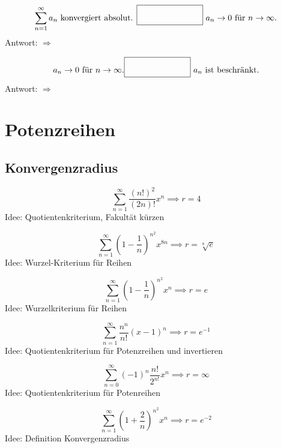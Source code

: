 \documentclass[parskip=full]{scrartcl}
\begin{document}
\begin{displaymath}
  \sum_{n = 1}^{\infty} a_n \text{ konvergiert absolut. } \fbox{\rule{1in}{0pt}\rule[-0.5ex]{0pt}{4ex}} \text{ } a_n \to 0 \text{ für } n \to \infty \text{.}
\end{displaymath}
Antwort: $\Rightarrow$

\begin{displaymath}
  a_n \to 0 \text{ für } n \to \infty \text{.} \fbox{\rule{1in}{0pt}\rule[-0.5ex]{0pt}{4ex}} \text{ } a_n \text{ ist beschränkt.}
\end{displaymath}
Antwort: $\Rightarrow$

\section{Potenzreihen}
\subsection{Konvergenzradius}
\begin{displaymath}
  \sum_{n = 1}^{\infty} \frac{(n!)^2}{(2n)!}x^n \implies r = 4
\end{displaymath}
Idee: Quotientenkriterium, Fakultät kürzen

\begin{displaymath}
  \sum_{n = 1}^{\infty} \left(1 - \frac{1}{n}\right)^{n^2} x^{8n} \implies r = \sqrt[8]{e}
\end{displaymath}
Idee: Wurzel-Kriterium für Reihen

\begin{displaymath}
  \sum_{n = 1}^{\infty} \left(1 - \frac{1}{n}\right)^{n^2}x^n \implies r = e
\end{displaymath}
Idee: Wurzelkriterium für Reihen

\begin{displaymath}
  \sum_{n = 1}^{\infty} \frac{n^n}{n!} (x-1)^n \implies r = e^{-1}
\end{displaymath}
Idee: Quotientenkriterium für Potenzreihen und invertieren

\begin{displaymath}
  \sum_{n = 0}^{\infty} (-1)^n \frac{n!}{2^{n!}} x^n \implies r = \infty
\end{displaymath}
Idee: Quotientenkriterium für Potenreihen

\begin{displaymath}
  \sum_{n = 1}^{\infty} \left(1 + \frac{2}{n}\right)^{n^2} x^n \implies r = e^{-2}
\end{displaymath}
Idee: Definition Konvergenzradius
\end{document}
